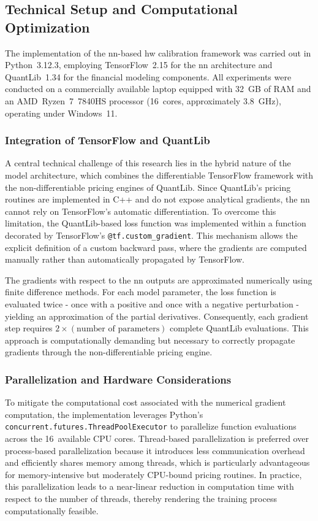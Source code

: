 \subsection{Technical Setup and Computational Optimization}
\label{subsec:technical_setup}
The implementation of the \ac{nn}-based \ac{hw} calibration framework was carried out in Python~3.12.3, employing TensorFlow~2.15 for the \ac{nn} architecture and QuantLib~1.34 for the financial modeling components. All experiments were conducted on a commercially available laptop equipped with 32~GB of RAM and an AMD~Ryzen~7~7840HS processor (16~cores, approximately 3.8~GHz), operating under Windows~11.

\subsubsection{Integration of TensorFlow and QuantLib}
A central technical challenge of this research lies in the hybrid nature of the model architecture, which combines the differentiable TensorFlow framework with the non-differentiable pricing engines of QuantLib. Since QuantLib's pricing routines are implemented in C++ and do not expose analytical gradients, the \ac{nn} cannot rely on TensorFlow's automatic differentiation. To overcome this limitation, the QuantLib-based loss function was implemented within a function decorated by TensorFlow's \texttt{@tf.custom\_gradient}. This mechanism allows the explicit definition of a custom backward pass, where the gradients are computed manually rather than automatically propagated by TensorFlow.

The gradients with respect to the \ac{nn} outputs are approximated numerically using finite difference methods. For each model parameter, the loss function is evaluated twice - once with a positive and once with a negative perturbation - yielding an approximation of the partial derivatives. Consequently, each gradient step requires $2 \times (\text{number of parameters})$ complete QuantLib evaluations. This approach is computationally demanding but necessary to correctly propagate gradients through the non-differentiable pricing engine.

\subsubsection{Parallelization and Hardware Considerations}
To mitigate the computational cost associated with the numerical gradient computation, the implementation leverages Python's \texttt{concurrent.futures.ThreadPoolExecutor} to parallelize function evaluations across the 16~available CPU cores. Thread-based parallelization is preferred over process-based parallelization because it introduces less communication overhead and efficiently shares memory among threads, which is particularly advantageous for memory-intensive but moderately CPU-bound pricing routines. In practice, this parallelization leads to a near-linear reduction in computation time with respect to the number of threads, thereby rendering the training process computationally feasible.

